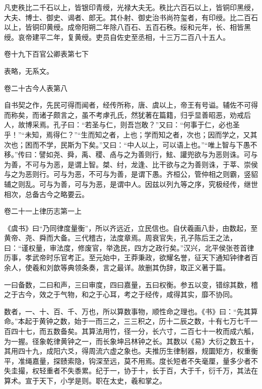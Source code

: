\documentclass[12pt,UTF8]{ctexbook}
\begin{document}
凡吏秩比二千石以上，皆银印青绶，光禄大夫无。秩比六百石以上，皆铜印黑绶，大夫、博士、御史、谒者、郎无。其仆射、御史治书尚符玺者，有印绶。比二百石以上，皆铜印黄绶。成帝阳朔二年除八百石、五百石秩。绥和元年，长、相皆黑绶。哀帝建平二年，复黄绶。吏员自佐史至丞相，十三万二百八十五人。





卷十九下百官公卿表第七下



表略，无系文。





卷二十古今人表第八



自书契之作，先民可得而闻者，经传所称，唐、虞以上，帝王有号谥。辅佐不可得而称矣，而诸子颇言之，虽不考虖孔氏，然犹著在篇籍，归乎显善昭恶，劝戒后人，故博采焉。孔子曰：“若圣与仁，则吾岂敢？”又曰：“何事于仁，必也圣乎！”“未知，焉得仁？”“生而知之者，上也；学而知之者，次也；因而学之，又其次也；困而不学，民斯为下矣。”又曰：“中人以上，可以语上也。”“唯上智与下愚不移。”传曰：譬如尧、舜，禹、稷、卨与之为善则行，鮌、讙兜欲与为恶则诛。可与为善，不可与为恶，是谓上智。桀、纣，龙逢、比干欲与之为善则诛，于莘、崇侯与之为恶则行。可与为恶，不可与为善，是谓下愚。齐桓公，管仲相之则霸，竖貂辅之则乱。可与为善，可与为恶，是谓中人。因兹以列九等之序，究极经传，继世相次，总备古今之略要云。





卷二十一上律历志第一上



《虞书》曰“乃同律度量衡”，所以齐远近，立民信也。自伏羲画八卦，由数起，至黄帝、尧、舜而大备。三代稽古，法度章焉。周衰官失，孔子陈后王之法，曰：“谨权量，审法度，修废官，举逸民，四方之政行矣。”汉兴，北平侯张苍首律历事，孝武帝时乐官考正。至元始中，王莽秉政，欲耀名誉，征天下通知钟律者百余人，使羲和刘歆等典领条奏，言之最详。故删其伪辞，取正义著于篇。



一曰备数，二曰和声，三曰审度，四曰嘉量，五曰权衡。参五以变，错综其数，稽之于古今，效之于气物，和之于心耳，考之于经传，咸得其实，靡不协同。



数者，一、十、百、千、万也，所以算数事物，顺性命之理也。《书》曰：“先其算命。”本起于黄钟之数，始于一而三之，三三积之，历十二辰之数，十有七万七千一百四十七，而五数备矣。其算法用竹，径一分，长六寸，二百七十一枚而成六觚，为一握。径象乾律黄钟之一，而长象坤吕林钟之长。其数以《易》大衍之数五十，其用四十九，成阳六爻，得周流六虚之象也。夫推历生律制器，规圜矩方，权重衡平，准绳嘉量，探赜索隐，钩深至远，莫不用焉。度长短者不失毫厘，量多少者不失圭撮，权轻重者不失黍累。纪于一，协于十，长于百，大于千，衍千万，其法在算术。宣于天下，小学是则。职在太史，羲和掌之。
\end{document}
